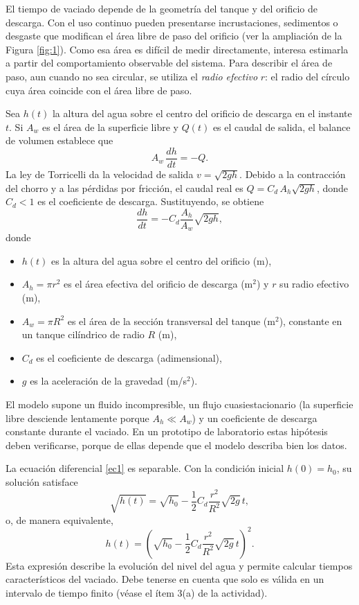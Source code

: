\documentclass[oneside,letter,spanish,activeacute,english,links,10pt]{amcaGCS_EDO}
\begin{document}
	El tiempo de vaciado depende de la geometría del tanque y del orificio de descarga. Con el uso continuo pueden presentarse incrustaciones, sedimentos o desgaste que modifican el área libre de paso del orificio (ver la ampliación de la Figura \ref{fig:1}). Como esa área es difícil de medir directamente, interesa estimarla a partir del comportamiento observable del sistema. Para describir el área de paso, aun cuando no sea circular, se utiliza el \emph{radio efectivo} $r$: el radio del círculo cuya área coincide con el área libre de paso.
	
	Sea $h(t)$ la altura del agua sobre el centro del orificio de descarga en el instante $t$. Si $A_w$ es el área de la superficie libre y $Q(t)$ es el caudal de salida, el balance de volumen establece que
	$$
	A_w\,\frac{dh}{dt}=-Q .
	$$
	La ley de Torricelli da la velocidad de salida $v=\sqrt{2gh}$. Debido a la contracción del chorro y a las pérdidas por fricción, el caudal real es $Q=C_d\,A_h\sqrt{2gh}$, donde $C_d<1$ es el coeficiente de descarga. Sustituyendo, se obtiene
	\begin{equation}\label{ec1}
		\frac{d h}{d t}=-C_d \frac{A_h}{A_w} \sqrt{2 g h},
	\end{equation}
	donde
	\begin{itemize}
		\item $h(t)$ es la altura del agua sobre el centro del orificio (m),
		\item $A_h=\pi r^2$ es el área efectiva del orificio de descarga (m$^2$) y $r$ su radio efectivo (m),
		\item $A_w=\pi R^2$ es el área de la sección transversal del tanque (m$^2$), constante en un tanque cilíndrico de radio $R$ (m),
		\item $C_d$ es el coeficiente de descarga (adimensional),
		\item $g$ es la aceleración de la gravedad (m/s$^2$).
	\end{itemize}
	El modelo supone un fluido incompresible, un flujo cuasiestacionario (la superficie libre desciende lentamente porque $A_h\ll A_w$) y un coeficiente de descarga constante durante el vaciado. En un prototipo de laboratorio estas hipótesis deben verificarse, porque de ellas depende que el modelo describa bien los datos.
	
	La ecuación diferencial \eqref{ec1} es separable. Con la condición inicial $h(0)=h_0$, su solución satisface
	$$
	\sqrt{h(t)}=\sqrt{h_0}-\frac{1}{2} C_d \frac{r^2}{R^2} \sqrt{2 g}\, t ,
	$$
	o, de manera equivalente,
	\begin{equation}\label{ec2}
		h(t)=\left(\sqrt{h_0}-\frac{1}{2} C_d \frac{r^2}{R^2} \sqrt{2 g}\, t\right)^2 .
	\end{equation}
	Esta expresión describe la evolución del nivel del agua y permite calcular tiempos característicos del vaciado. Debe tenerse en cuenta que solo es válida en un intervalo de tiempo finito (véase el ítem 3(a) de la actividad).
	
\end{document}
